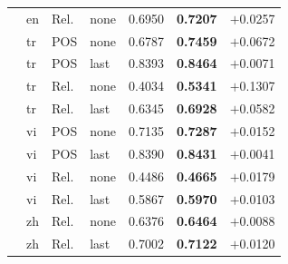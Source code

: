 \begin{table}[h]
\begin{tabular}{llllccr}
  & en & Rel.  & none & 0.6950 & \textbf{0.7207} & $+$0.0257 \\
  & tr & POS  & none & 0.6787 & \textbf{0.7459} & $+$0.0672 \\
  & tr & POS  & last & 0.8393 & \textbf{0.8464} & $+$0.0071 \\
  & tr & Rel.  & none & 0.4034 & \textbf{0.5341} & $+$0.1307 \\
  & tr & Rel.  & last & 0.6345 & \textbf{0.6928} & $+$0.0582 \\
  & vi & POS  & none & 0.7135 & \textbf{0.7287} & $+$0.0152 \\
  & vi & POS  & last & 0.8390 & \textbf{0.8431} & $+$0.0041 \\
  & vi & Rel.  & none & 0.4486 & \textbf{0.4665} & $+$0.0179 \\
  & vi & Rel.  & last & 0.5867 & \textbf{0.5970} & $+$0.0103 \\
  & zh & Rel.  & none & 0.6376 & \textbf{0.6464} & $+$0.0088 \\
  & zh & Rel.  & last & 0.7002 & \textbf{0.7122} & $+$0.0120 \\
\bottomrule
\end{tabular}
\end{table}
